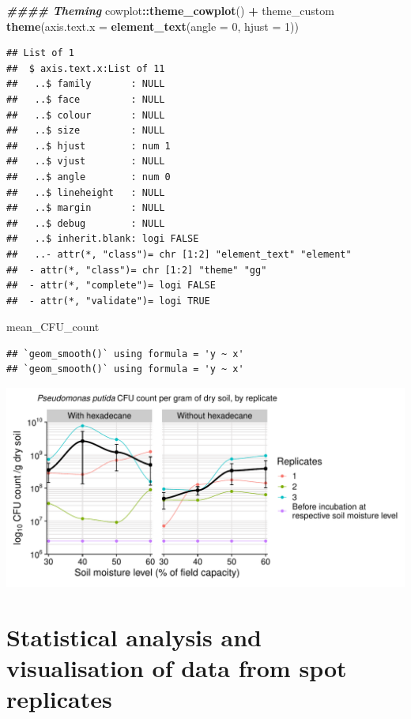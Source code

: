 \documentclass[
]{article}
\newenvironment{Shaded}{\begin{snugshade}}{\end{snugshade}}
\newcommand{\AttributeTok}[1]{\textcolor[rgb]{0.13,0.29,0.53}{#1}}
\newcommand{\DecValTok}[1]{\textcolor[rgb]{0.00,0.00,0.81}{#1}}
\newcommand{\DocumentationTok}[1]{\textcolor[rgb]{0.56,0.35,0.01}{\textbf{\textit{#1}}}}
\newcommand{\FunctionTok}[1]{\textcolor[rgb]{0.13,0.29,0.53}{\textbf{#1}}}
\newcommand{\NormalTok}[1]{#1}
\newcommand{\SpecialCharTok}[1]{\textcolor[rgb]{0.81,0.36,0.00}{\textbf{#1}}}
\begin{document}
\begin{Shaded}
\begin{Highlighting}[]
  \DocumentationTok{\#\#\#\# Theming}
\NormalTok{  cowplot}\SpecialCharTok{::}\FunctionTok{theme\_cowplot}\NormalTok{() }\SpecialCharTok{+}
\NormalTok{  theme\_custom}
\FunctionTok{theme}\NormalTok{(}\AttributeTok{axis.text.x =} \FunctionTok{element\_text}\NormalTok{(}\AttributeTok{angle =} \DecValTok{0}\NormalTok{, }\AttributeTok{hjust =} \DecValTok{1}\NormalTok{))}
\end{Highlighting}
\end{Shaded}

\begin{verbatim}
## List of 1
##  $ axis.text.x:List of 11
##   ..$ family       : NULL
##   ..$ face         : NULL
##   ..$ colour       : NULL
##   ..$ size         : NULL
##   ..$ hjust        : num 1
##   ..$ vjust        : NULL
##   ..$ angle        : num 0
##   ..$ lineheight   : NULL
##   ..$ margin       : NULL
##   ..$ debug        : NULL
##   ..$ inherit.blank: logi FALSE
##   ..- attr(*, "class")= chr [1:2] "element_text" "element"
##  - attr(*, "class")= chr [1:2] "theme" "gg"
##  - attr(*, "complete")= logi FALSE
##  - attr(*, "validate")= logi TRUE
\end{verbatim}

\begin{Shaded}
\begin{Highlighting}[]
\NormalTok{mean\_CFU\_count}
\end{Highlighting}
\end{Shaded}

\begin{verbatim}
## `geom_smooth()` using formula = 'y ~ x'
## `geom_smooth()` using formula = 'y ~ x'
\end{verbatim}

\includegraphics{analysis_files/figure-latex/visualise-allgroups-1.pdf}

\section{Statistical analysis and visualisation of data from spot
replicates}\label{statistical-analysis-and-visualisation-of-data-from-spot-replicates}
\end{document}
